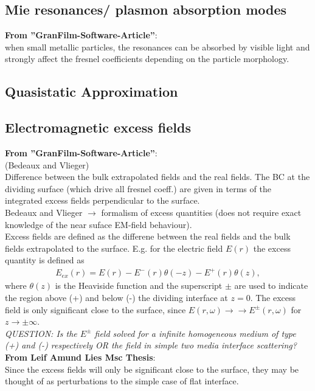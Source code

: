 \subsection{Mie resonances/ plasmon absorption modes}
\textbf{From ''GranFilm-Software-Article''}: \\
when small metallic particles, the resonances can be absorbed by visible light and strongly affect the fresnel 
coefficients depending on the particle morphology.
%
\subsection{Quasistatic Approximation}
%
\subsection{Electromagnetic excess fields }
%
\textbf{From ''GranFilm-Software-Article''}: \\
(Bedeaux and Vlieger) \\
Difference between the bulk extrapolated fields and the real fields. The BC at the dividing surface
(which drive all fresnel coeff.) are given in terms of the integrated excess fields perpendicular to
the surface. \\
Bedeaux and Vlieger $\rightarrow$ formalism of excess quantities (does not require exact knowledge of the near suface EM-field behaviour). \\
Excess fields are defined as the differene between the real fields and the bulk fields extrapolated to the surface. E.g. for the electric field $E(r)$ the excess quantity is defined as
\begin{align}
   E_{ex} (r) = E(r) - E^-(r) \theta(-z) - E^+(r)\theta(z),
\end{align}
where $\theta(z)$ is the Heaviside function and the superscript $\pm$ are used to indicate the region above (+) and below (-) the dividing interface at $z = 0$. 
The excess field is only significant close to the surface, since $E(r, \omega) \rightarrow \rightarrow E^{\pm}(r,\omega)$  for $z \rightarrow \pm \infty$. \\
\textit{QUESTION: \@ Is the $E^{\pm}$ field solved for a infinite homogeneous medium of type (+) and (-) respectively  OR the field in simple two media interface scattering?} \\
\textbf{From Leif Amund Lies Msc Thesis}: \\
Since the excess fields will only be significant close to the surface, they may be thought of as perturbations to the simple case of flat interface. 
